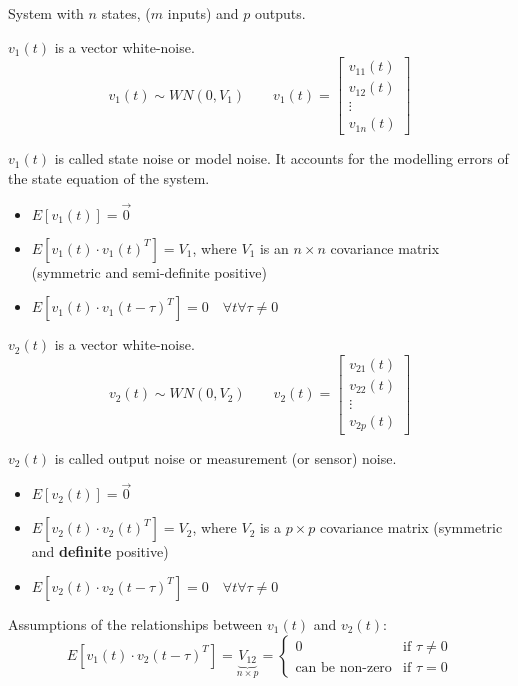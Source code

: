System with $n$ states, ($m$ inputs) and $p$ outputs.

$v_1(t)$ is a vector white-noise.
\[
    v_1(t) \sim WN(0, V_1) \qquad v_1(t) = \begin{bmatrix}
        v_{11}(t) \\
        v_{12}(t) \\
        \vdots \\
        v_{1n}(t)
    \end{bmatrix}
\]

$v_1(t)$ is called state noise or model noise.
It accounts for the modelling errors of the state equation of the system.

\begin{itemize}
    \item $E[v_1(t)] = \vec{0}$
    \item $E[v_1(t) \cdot v_1(t)^T] = V_1$, where $V_1$ is an $n\times n$ covariance matrix (symmetric and semi-definite positive)
    \item $E[v_1(t) \cdot v_1(t-\tau)^T] = 0 \quad \forall t \forall \tau \ne 0$
\end{itemize}

$v_2(t)$ is a vector white-noise.
\[
    v_2(t) \sim WN(0, V_2) \qquad v_2(t) = \begin{bmatrix}
        v_{21}(t) \\
        v_{22}(t) \\
        \vdots \\
        v_{2p}(t)
    \end{bmatrix}
\]

$v_2(t)$ is called output noise or measurement (or sensor) noise.
\begin{itemize}
    \item $E[v_2(t)] = \vec{0}$
    \item $E[v_2(t) \cdot v_2(t)^T] = V_2$, where $V_2$ is a $p\times p$ covariance matrix (symmetric and \textbf{definite} positive)
    \item $E[v_2(t) \cdot v_2(t-\tau)^T] = 0 \quad \forall t \forall \tau \ne 0$
\end{itemize}

Assumptions of the relationships between $v_1(t)$ and $v_2(t)$:
\[
    E[v_1(t) \cdot v_2(t-\tau)^T] = \underbrace{V_{12}}_{n\times p} = \begin{cases}
        0 & \text{if } \tau \ne 0 \\
        \text{can be non-zero} & \text{if } \tau = 0
    \end{cases}
\]

